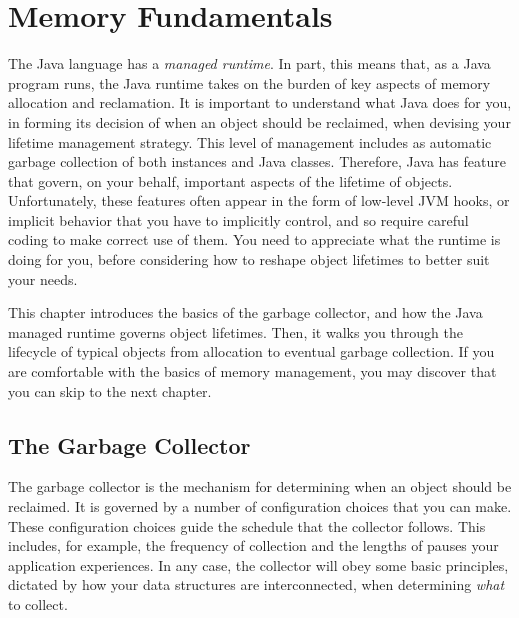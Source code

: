
\chapter{Memory Fundamentals}

The Java language has a \emph{managed runtime}. In part, this means that, as a
Java program runs, the Java runtime takes on the burden of key aspects of memory
allocation and reclamation. It is important to understand what Java does for you,
in forming its decision of when an object should be reclaimed, when devising your
lifetime management strategy. This level of management includes as automatic
garbage collection of both instances and Java classes. Therefore, Java has
feature that govern, on your behalf, important aspects of the lifetime of
objects. Unfortunately, these features often appear in the form of low-level JVM
hooks, or implicit behavior that you have to implicitly control, and so require
careful coding to make correct use of them. You need to appreciate what the
runtime is doing for you, before considering how to reshape object lifetimes to
better suit your needs.



This chapter introduces the basics of the garbage collector, and how the Java
managed runtime governs object lifetimes. Then, it walks you through the
lifecycle of typical objects from allocation to eventual garbage collection. If
you are comfortable with the basics of memory management, you may discover that
you can skip to the next chapter.

\section{The Garbage Collector}
The garbage collector is the mechanism for determining when an object should be
reclaimed. It is governed by a number of configuration choices that you can make.
These configuration choices guide the schedule that the collector follows. This
includes, for example, the frequency of collection and the lengths of pauses your
application experiences. In any case, the collector will obey some basic
principles, dictated by how your data structures are interconnected, when
determining \emph{what} to collect.

